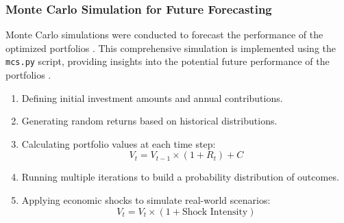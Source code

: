 \subsubsection{Monte Carlo Simulation for Future Forecasting}
Monte Carlo simulations were conducted to forecast the performance of the optimized portfolios \citep{glasserman2004monte}. This comprehensive simulation is implemented using the \texttt{mcs.py} script, providing insights into the potential future performance of the portfolios \citep{brown2000real, kuhle2021economic}.
\begin{enumerate}
    \item Defining initial investment amounts and annual contributions.
    \vspace{-0.15em}
    \item Generating random returns based on historical distributions.
    \vspace{-0.15em}
    \item Calculating portfolio values at each time step:
    \vspace{-0.15em}
    \begin{equation}
    
        V_t = V_{t-1} \times (1 + R_t) + C
        
    \end{equation}
    \vspace{-0.15em}
    \item Running multiple iterations to build a probability distribution of outcomes.
    \vspace{-0.15em}
    \item Applying economic shocks to simulate real-world scenarios:
    \vspace{-0.15em}
    \begin{equation}
        V_t = V_t \times (1 + \text{Shock Intensity})
    \end{equation}
\end{enumerate}

\newpage
